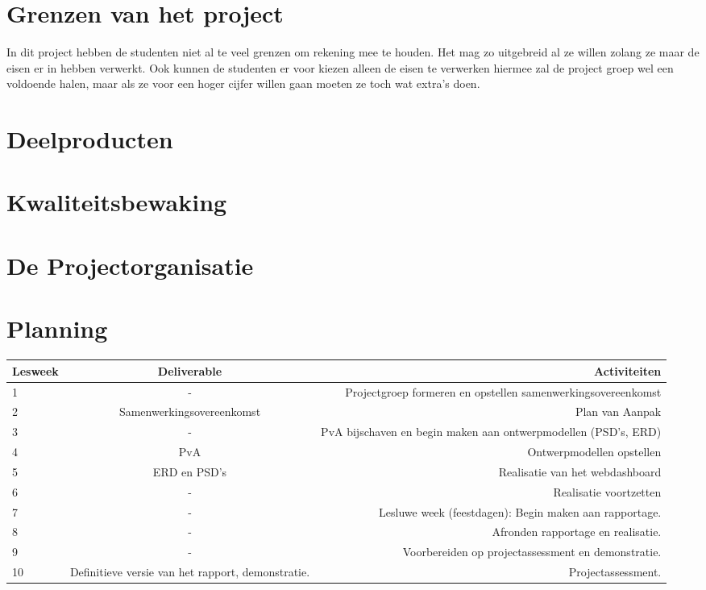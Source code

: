 \documentclass[11pt]{article}
\begin{document}
	
	

\newpage
\section[Grenzen] {Grenzen van het project}

In dit project hebben de studenten niet al te veel grenzen om rekening mee te houden. Het mag zo uitgebreid al ze willen zolang ze maar de eisen er in hebben verwerkt. Ook kunnen de studenten er voor kiezen alleen de eisen te verwerken hiermee zal de project groep wel een voldoende halen, maar als ze voor een hoger cijfer willen gaan moeten ze toch wat extra's doen. 

\newpage
\section{Deelproducten}
\newpage
\section{Kwaliteitsbewaking}
\newpage
\section{De Projectorganisatie}
\newpage
\section{Planning}

\begin{adjustbox}{width=\textwidth}
\begin{tabular}{|l | c | r |}
	\hline
	Lesweek & Deliverable & Activiteiten \\ \hline
	1 & -	& Projectgroep formeren en opstellen samenwerkingsovereenkomst \\ \hline
	2 & Samenwerkingsovereenkomst & Plan van Aanpak\\ \hline
	3 & - & PvA bijschaven en begin maken aan ontwerpmodellen
	(PSD’s, ERD)\\ \hline
	4 & PvA & Ontwerpmodellen opstellen\\ \hline
	5 & ERD en PSD's & Realisatie van het webdashboard\\ \hline
	6 & - & Realisatie voortzetten\\ \hline
	7 & - & Lesluwe week (feestdagen): Begin maken aan rapportage.\\ \hline
	8 & - & Afronden rapportage en realisatie.\\ \hline
	9 & - & Voorbereiden op projectassessment en demonstratie.\\ \hline
	10 & Definitieve versie van	het rapport, demonstratie.&
Projectassessment.\\ \hline
	
\end{tabular}
\end{adjustbox}
\newpage
\end{document}
